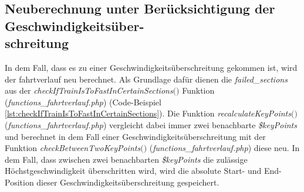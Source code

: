 \subsection{Neuberechnung unter Berücksichtigung der Geschwindigkeitsüber-\\schreitung} \label{neuberechnung}
In dem Fall, dass es zu einer Geschwindigkeitsüberschreitung gekommen ist, wird der \Gls{fahrtverlauf} neu berechnet. Als Grundlage dafür dienen die \textit{failed\_sections} aus der \textit{check\-If\-Train\-Is\-To\-Fast\-In\-Certain\-Sections$($$)$} Funktion (\textit{functions\_fahrtverlauf.php}) (Code-Beispiel \ref{lst:checkIfTrainIsToFastInCertainSections}). Die Funktion \textit{recalculate\-Key\-Points$($$)$} (\textit{functions\_fahrtverlauf.php}) vergleicht dabei immer zwei benachbarte \textit{\$keyPoints} und berechnet in dem Fall einer Geschwindigkeitsüberschreitung mit der Funktion \textit{check\-Between\-Two\-Key\-Points$($$)$} (\textit{func\-tions\_\linebreak[4]fahrt\-ver\-lauf\-.php}) diese neu. In dem Fall, dass zwischen zwei benachbarten \textit{\$key\-Points} die zulässige Höchst\-ge\-schwin\-dig\-keit überschritten wird, wird die absolute Start- und End-Position dieser Ge\-schwin\-digkeits\-über\-schrei\-tung gespeichert. 

